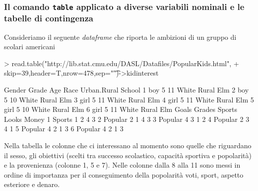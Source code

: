 \documentclass[onecolumn,12pt]{book}
\begin{document}
\subsubsection{Il comando \texttt{table} applicato a diverse variabili nominali e le tabelle di contingenza}
Consideriamo il seguente \emph{dataframe} che riporta le ambizioni di un gruppo di scolari americani
\begin{Schunk}
\begin{Sinput}
> read.table("http://lib.stat.cmu.edu/DASL/Datafiles/PopularKids.html",
+ skip=39,header=T,nrow=478,sep="\t")->kidinterest
\end{Sinput}
\end{Schunk}
\begin{Schunk}
\begin{Soutput}
  Gender Grade Age  Race Urban.Rural School
1    boy     5  11 White       Rural    Elm
2    boy     5  10 White       Rural    Elm
3   girl     5  11 White       Rural    Elm
4   girl     5  11 White       Rural    Elm
5   girl     5  10 White       Rural    Elm
6   girl     5  11 White       Rural    Elm
    Goals Grades Sports Looks Money
1  Sports      1      2     4     3
2 Popular      2      1     4     3
3 Popular      4      3     1     2
4 Popular      2      3     4     1
5 Popular      4      2     1     3
6 Popular      4      2     1     3
\end{Soutput}
\end{Schunk}
Nella tabella le colonne che ci interessano al momento sono quelle che riguardano il sesso, gli obiettivi (scelti tra successo scolastico, capacit\`a sportiva e popolarit\`a) e la provenienza (colonne 1, 5  e 7). Nelle colonne dalla 8 alla 11 sono messi in ordine di importanza per il conseguimento della popolarit\`a  voti, sport, aspetto esteriore e denaro.
\end{document}
